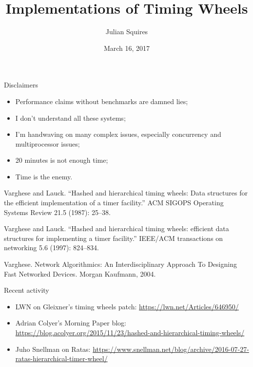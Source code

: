 \documentclass{beamer}
\title{Implementations of Timing Wheels}
\author{Julian Squires}
\institute{AdGear Technologies, Inc.}
\date{March 16, 2017}
\begin{document}
\begin{frame}
  \titlepage{}
\end{frame}

\begin{frame}{Disclaimers}
  \begin{itemize}
  \item Performance claims without benchmarks are damned lies;
  \item I don't understand all these systems;
  \item I'm handwaving on many complex issues, especially concurrency
    and multiprocessor issues;
  \item 20 minutes is not enough time;
  \item Time is the enemy.
  \end{itemize}
\end{frame}

\begin{frame}
  Varghese and Lauck. ``Hashed and hierarchical timing
wheels: Data structures for the efficient implementation of a timer
facility.'' ACM SIGOPS Operating Systems Review 21.5 (1987): 25--38.

\vspace{1.5em}

Varghese and Lauck. ``Hashed and hierarchical timing wheels: efficient
data structures for implementing a timer facility.''  IEEE/ACM
transactions on networking 5.6 (1997): 824--834.

\vspace{1.5em}

Varghese. Network Algorithmics: An Interdisciplinary Approach
To Designing Fast Networked Devices. Morgan Kaufmann, 2004.
\end{frame}

\begin{frame}{Recent activity}
  \begin{itemize}
  \item LWN on Gleixner's timing wheels patch:
    \hyperlink{https://lwn.net/Articles/646950/}{https://lwn.net/Articles/646950/}

  \item Adrian Colyer's Morning Paper blog:
    \hyperlink{https://blog.acolyer.org/2015/11/23/hashed-and-hierarchical-timing-wheels/}{https://blog.acolyer.org/2015/11/23/hashed-and-hierarchical-timing-wheels/}

  \item Juho Snellman on Ratas:
    \hyperlink{https://www.snellman.net/blog/archive/2016-07-27-ratas-hierarchical-timer-wheel/}{https://www.snellman.net/blog/archive/2016-07-27-ratas-hierarchical-timer-wheel/}
  \end{itemize}
\end{frame}
\end{document}
